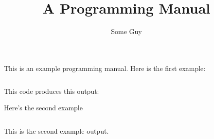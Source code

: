 \documentclass[12pt, letterpaper]{article}
\title{A Programming Manual}
\author{Some Guy}
\begin{document}
This is an example programming manual. Here is the first example:

\inputminted[]{c}{example1.c}

This code produces this output:



Here's the second example
\inputminted[]{c}{example2.c}

This is the second example output.


\end{document}
